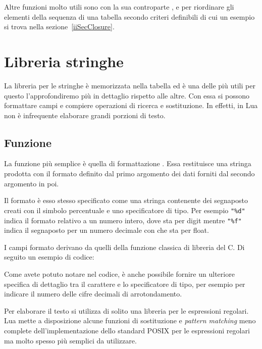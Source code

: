 Altre funzioni molto utili sono  con la
sua controparte , e
 per riordinare gli elementi della sequenza di
una tabella secondo criteri definibili di cui un esempio si trova nella
sezione~\ref{iiSecClosure}.


\section{Libreria stringhe}

La libreria per le stringhe è memorizzata nella tabella  ed è una
delle più utili per questo l'approfondiremo più in dettaglio rispetto alle
altre. Con essa si possono formattare campi e compiere operazioni di ricerca e
sostituzione. In effetti, in Lua non è infrequente elaborare grandi porzioni di
testo.


\subsection{Funzione }
\label{iiSecStringFormat}

La funzione più semplice è quella di formattazione
. Essa restituisce una stringa prodotta
con il formato definito dal primo argomento dei dati forniti dal secondo
argomento in poi.

Il formato è esso stesso specificato come una stringa contenente dei segnaposto
creati con il simbolo percentuale e uno specificatore di tipo. Per esempio
\verb|"%d"| indica il formato relativo a un numero intero, dove  sta per
digit mentre \verb|"%f"| indica il segnaposto per un numero decimale con 
che sta per float.

I campi formato derivano da quelli della funzione classica di libreria
 del C. Di seguito un esempio di codice:

Come avete potuto notare nel codice, è anche possibile fornire un ulteriore
specifica di dettaglio tra il carattere \key{\%} e lo specificatore di tipo, per
esempio per indicare il numero delle cifre decimali di arrotondamento.

Per elaborare il testo si utilizza di solito una libreria per le espressioni
regolari. Lua mette a disposizione alcune funzioni di sostituzione e
\emph{pattern matching} meno complete dell'implementazione dello standard
POSIX per le espressioni regolari ma molto spesso più semplici da utilizzare.

